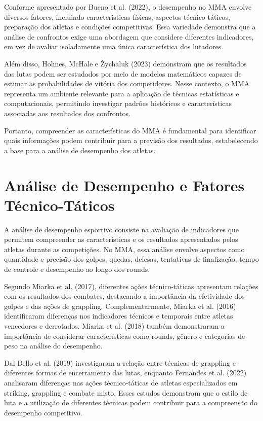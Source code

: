 \documentclass[12pt,a4paper]{report}
\begin{document}
Conforme apresentado por Bueno et al. (2022), o desempenho no MMA envolve diversos fatores, incluindo características físicas, aspectos técnico-táticos, preparação dos atletas e condições competitivas. Essa variedade demonstra que a análise de confrontos exige uma abordagem que considere diferentes indicadores, em vez de avaliar isoladamente uma única característica dos lutadores.

Além disso, Holmes, McHale e Żychaluk (2023) demonstram que os resultados das lutas podem ser estudados por meio de modelos matemáticos capazes de estimar as probabilidades de vitória dos competidores. Nesse contexto, o MMA representa um ambiente relevante para a aplicação de técnicas estatísticas e computacionais, permitindo investigar padrões históricos e características associadas aos resultados dos confrontos.

Portanto, compreender as características do MMA é fundamental para identificar quais informações podem contribuir para a previsão dos resultados, estabelecendo a base para a análise de desempenho dos atletas.

\section{Análise de Desempenho e Fatores Técnico-Táticos}

A análise de desempenho esportivo consiste na avaliação de indicadores que permitem compreender as características e os resultados apresentados pelos atletas durante as competições. No MMA, essa análise envolve aspectos como quantidade e precisão dos golpes, quedas, defesas, tentativas de finalização, tempo de controle e desempenho ao longo dos rounds.

Segundo Miarka et al. (2017), diferentes ações técnico-táticas apresentam relações com os resultados dos combates, destacando a importância da efetividade dos golpes e das ações de grappling. Complementarmente, Miarka et al. (2016) identificaram diferenças nos indicadores técnicos e temporais entre atletas vencedores e derrotados. Miarka et al. (2018) também demonstraram a importância de considerar características como rounds, gênero e categorias de peso na análise do desempenho.

Dal Bello et al. (2019) investigaram a relação entre técnicas de grappling e diferentes formas de encerramento das lutas, enquanto Fernandes et al. (2022) analisaram diferenças nas ações técnico-táticas de atletas especializados em striking, grappling e combate misto. Esses estudos demonstram que o estilo de luta e a utilização de diferentes técnicas podem contribuir para a compreensão do desempenho competitivo.
\end{document}
